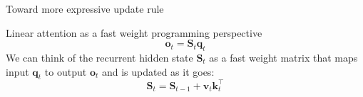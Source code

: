 \begin{frame}{}
    \centering
    \LARGE
    Toward more expressive update rule
\end{frame}

\begin{frame}{Linear attention as a fast weight programming perspective}
\[
    \mathbf{o}_t = \mathbf{S}_t \mathbf{q}_t
\]
We can think of the recurrent hidden state $\mathbf{S}_t$ as a fast weight matrix that maps input $\mathbf{q}_t$ to output $\mathbf{o}_t$ and is updated as it goes:
\[\mathbf{S}_t = \mathbf{S}_{t-1} + \mathbf{v}_t\mathbf{k}_t^\top\]

\end{frame}




